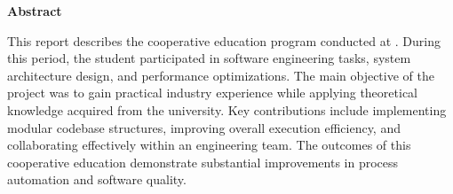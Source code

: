 \newpage
{}
\renewcommand{\thepage}{(1)}

\begin{center}
    {\bfseries Abstract \par}
\end{center}
\vspace{1em}

\noindent
This report describes the cooperative education program conducted at \companyName.
During this period, the student participated in software engineering tasks, system architecture design, and performance optimizations.
The main objective of the project was to gain practical industry experience while applying theoretical knowledge acquired from the university.
Key contributions include implementing modular codebase structures, improving overall execution efficiency, and collaborating effectively within an engineering team.
The outcomes of this cooperative education demonstrate substantial improvements in process automation and software quality.
